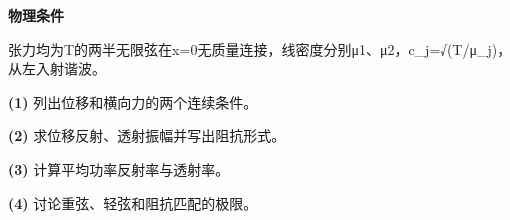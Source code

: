 \textbf{物理条件}\par 张力均为T的两半无限弦在x=0无质量连接，线密度分别μ1、μ2，c\_j=√(T/μ\_j)，从左入射谐波。
\par\noindent\textbf{(1)} 列出位移和横向力的两个连续条件。
\par\noindent\textbf{(2)} 求位移反射、透射振幅并写出阻抗形式。
\par\noindent\textbf{(3)} 计算平均功率反射率与透射率。
\par\noindent\textbf{(4)} 讨论重弦、轻弦和阻抗匹配的极限。
